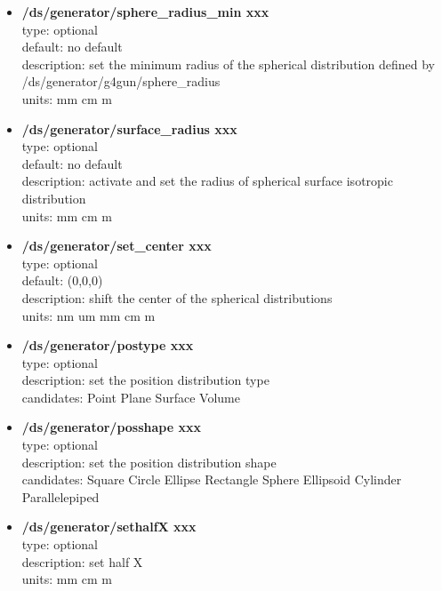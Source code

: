 \documentclass[twocolumn, 10pt]{article}
\begin{document}
\begin{itemize}
\item \textbf{/ds/generator/sphere\_radius\_min xxx}\\
type: optional \\
default: no default\\
description: set the minimum  radius of the spherical distribution defined 
by /ds/generator/g4gun/sphere\_radius\\
units:  mm cm m\\

\item \textbf{/ds/generator/surface\_radius xxx}\\
type: optional \\
default: no default\\
description: activate and set the radius of  spherical surface isotropic
distribution \\
units:  mm cm m\\

\item \textbf{/ds/generator/set\_center xxx}\\
type: optional \\
default: (0,0,0)\\
description: shift the center of the spherical distributions\\
units: nm um mm cm m\\

\item \textbf{/ds/generator/postype xxx}\\
type: optional \\
description: set the position distribution type\\
candidates: Point Plane Surface Volume\\

\item \textbf{/ds/generator/posshape xxx}\\
type: optional \\
description: set the position  distribution shape\\
candidates: Square Circle Ellipse Rectangle Sphere Ellipsoid Cylinder Parallelepiped\\

\item \textbf{/ds/generator/sethalfX xxx}\\
type: optional \\
description: set half X\\
units: mm cm m\\


\end{itemize}
\end{document}
